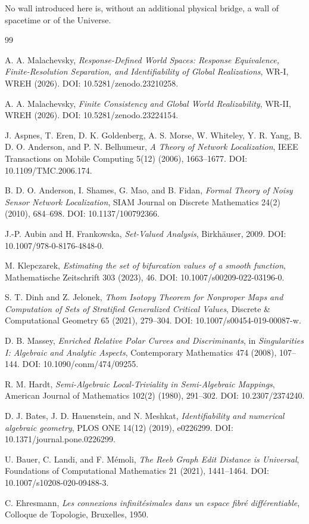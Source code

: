 \documentclass[11pt]{article}
\begin{document}
No wall introduced here is, without an additional physical bridge, a wall of
spacetime or of the Universe.

\begin{thebibliography}{99}

A. A. Malachevsky,
\emph{Response-Defined World Spaces: Response Equivalence,
Finite-Resolution Separation, and Identifiability of Global Realizations},
WR-I, WREH (2026).
DOI: 10.5281/zenodo.23210258.

A. A. Malachevsky,
\emph{Finite Consistency and Global World Realizability},
WR-II, WREH (2026).
DOI: 10.5281/zenodo.23224154.

J. Aspnes, T. Eren, D. K. Goldenberg, A. S. Morse, W. Whiteley,
Y. R. Yang, B. D. O. Anderson, and P. N. Belhumeur,
\emph{A Theory of Network Localization},
IEEE Transactions on Mobile Computing 5(12) (2006), 1663--1677.
DOI: 10.1109/TMC.2006.174.

B. D. O. Anderson, I. Shames, G. Mao, and B. Fidan,
\emph{Formal Theory of Noisy Sensor Network Localization},
SIAM Journal on Discrete Mathematics 24(2) (2010), 684--698.
DOI: 10.1137/100792366.

J.-P. Aubin and H. Frankowska,
\emph{Set-Valued Analysis},
Birkh\"auser, 2009.
DOI: 10.1007/978-0-8176-4848-0.

M. Klepczarek,
\emph{Estimating the set of bifurcation values of a smooth function},
Mathematische Zeitschrift 303 (2023), 46.
DOI: 10.1007/s00209-022-03196-0.

S. T. Dinh and Z. Jelonek,
\emph{Thom Isotopy Theorem for Nonproper Maps and Computation of Sets of
Stratified Generalized Critical Values},
Discrete \& Computational Geometry 65 (2021), 279--304.
DOI: 10.1007/s00454-019-00087-w.

D. B. Massey,
\emph{Enriched Relative Polar Curves and Discriminants},
in \emph{Singularities I: Algebraic and Analytic Aspects},
Contemporary Mathematics 474 (2008), 107--144.
DOI: 10.1090/conm/474/09255.

R. M. Hardt,
\emph{Semi-Algebraic Local-Triviality in Semi-Algebraic Mappings},
American Journal of Mathematics 102(2) (1980), 291--302.
DOI: 10.2307/2374240.

D. J. Bates, J. D. Hauenstein, and N. Meshkat,
\emph{Identifiability and numerical algebraic geometry},
PLOS ONE 14(12) (2019), e0226299.
DOI: 10.1371/journal.pone.0226299.

U. Bauer, C. Landi, and F. M\'emoli,
\emph{The Reeb Graph Edit Distance is Universal},
Foundations of Computational Mathematics 21 (2021), 1441--1464.
DOI: 10.1007/s10208-020-09488-3.

C. Ehresmann,
\emph{Les connexions infinit\'esimales dans un espace fibr\'e
diff\'erentiable},
Colloque de Topologie, Bruxelles, 1950.

\end{thebibliography}
\end{document}
